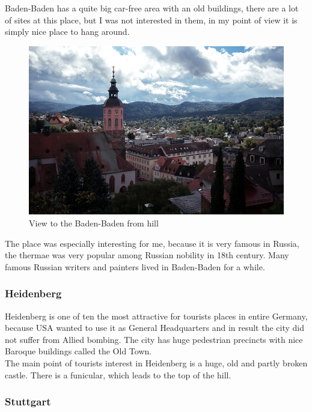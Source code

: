 \documentclass[english]{article}
\begin{document}
Baden-Baden has a quite big car-free area with an old buildings, there are a lot of sites at this place, but I was not interested in them, in my point of view it is simply nice place to hang around.\\

\begin{figure}
\centerline{\includegraphics[scale=0.5]{Germany_travel/baden}}
\caption{View to the Baden-Baden from hill}
\end{figure}

The place was especially interesting for me, because it is very famous in Russia, the thermae was very popular among Russian nobility in 18th century. Many famous Russian writers and painters lived in Baden-Baden for a while. 

\subsubsection{Heidenberg}

Heidenberg is one of ten the most attractive for tourists places in entire Germany, because USA wanted to use it as General Headquarters
and in result the city did not suffer from Allied bombing. The city has huge pedestrian precincts with nice Baroque buildings called the Old Town.\\

The main point of tourists interest in Heidenberg is a huge, old and partly broken castle. There is a funicular, which leads to the top of the hill.

\subsubsection{Stuttgart}
\end{document}
